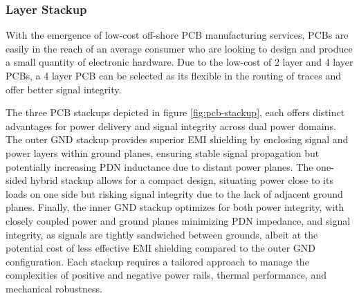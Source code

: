 \documentclass[10pt]{article}
\begin{document}
\begin{multicols*}{2}
                \subsubsection{Layer Stackup}
                    With the emergence of low-cost off-shore PCB manufacturing services, PCBs are easily in the reach of an average consumer who are looking to design and produce a small quantity of electronic hardware. Due to the low-cost of 2 layer and 4 layer PCBs, a 4 layer PCB can be selected as its flexible in the routing of traces and offer better signal integrity.\par
                    The three PCB stackups depicted in figure \ref{fig:pcb-stackup}, each offers distinct advantages for power delivery and signal integrity across dual power domains. The outer GND stackup provides superior EMI shielding by enclosing signal and power layers within ground planes, ensuring stable signal propagation but potentially increasing PDN inductance due to distant power planes. The one-sided hybrid stackup allows for a compact design, situating power close to its loads on one side but risking signal integrity due to the lack of adjacent ground planes. Finally, the inner GND stackup optimizes for both power integrity, with closely coupled power and ground planes minimizing PDN impedance, and signal integrity, as signals are tightly sandwiched between grounds, albeit at the potential cost of less effective EMI shielding compared to the outer GND configuration. Each stackup requires a tailored approach to manage the complexities of positive and negative power rails, thermal performance, and mechanical robustness.

                    \begin{figure}[ht]

                        \centering

                        \begin{subfigure}[b]{0.3333\linewidth}
                            \centering
\end{subfigure}
\end{figure}
\end{multicols*}
\end{document}
